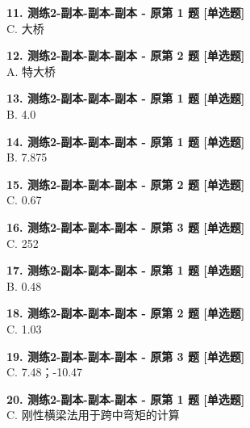 \documentclass[UTF8,zihao=-4,openany]{ctexbook}
\begin{document}
\begin{answerline}
\textbf{11. 测练2-副本-副本-副本 - 原第 1 题 [单选题]}\\
C. 大桥
\end{answerline}

\begin{answerline}
\textbf{12. 测练2-副本-副本-副本 - 原第 2 题 [单选题]}\\
A. 特大桥
\end{answerline}

\begin{answerline}
\textbf{13. 测练2-副本-副本-副本 - 原第 1 题 [单选题]}\\
B. 4.0
\end{answerline}

\begin{answerline}
\textbf{14. 测练2-副本-副本-副本 - 原第 1 题 [单选题]}\\
B. 7.875
\end{answerline}

\begin{answerline}
\textbf{15. 测练2-副本-副本-副本 - 原第 2 题 [单选题]}\\
C. 0.67
\end{answerline}

\begin{answerline}
\textbf{16. 测练2-副本-副本-副本 - 原第 3 题 [单选题]}\\
C. 252
\end{answerline}

\begin{answerline}
\textbf{17. 测练2-副本-副本-副本 - 原第 1 题 [单选题]}\\
B. 0.48
\end{answerline}

\begin{answerline}
\textbf{18. 测练2-副本-副本-副本 - 原第 2 题 [单选题]}\\
C. 1.03
\end{answerline}

\begin{answerline}
\textbf{19. 测练2-副本-副本-副本 - 原第 3 题 [单选题]}\\
C. 7.48；-10.47
\end{answerline}

\begin{answerline}
\textbf{20. 测练2-副本-副本-副本 - 原第 1 题 [单选题]}\\
C. 刚性横梁法用于跨中弯矩的计算
\end{answerline}
\end{document}
